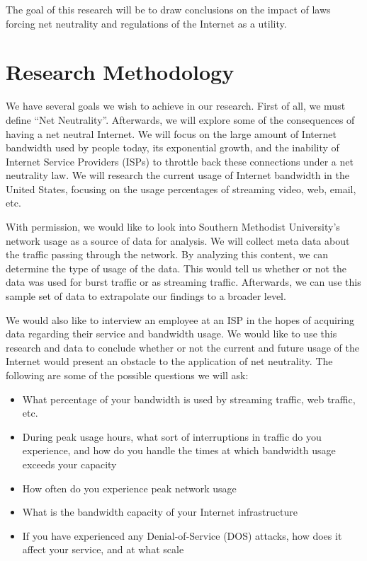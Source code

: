 \documentclass{sigcomm-alternate}
\begin{document}
The goal of this research will be to draw conclusions on the impact of laws forcing net neutrality and regulations of the Internet as a utility.

     		
\section{Research Methodology}
We have several goals we wish to achieve in our research. First of all, we must define ``Net Neutrality''. Afterwards, we will explore some of the consequences of having a net neutral Internet. We will focus on the large amount of Internet bandwidth used by people today, its exponential growth, and the inability of Internet Service Providers (ISPs) to throttle back these connections under a net neutrality law. We will research the current usage of Internet bandwidth in the United States, focusing on the usage percentages of streaming video, web, email, etc. 

With permission, we would like to look into Southern Methodist University's network usage as a source of data for analysis. We will collect meta data about the traffic passing through the network. By analyzing this content, we can determine the type of usage of the data. This would tell us whether or not the data was used for burst traffic or as streaming traffic. Afterwards, we can use this sample set of data to extrapolate our findings to a broader level. 

We would also like to interview an employee at an ISP in the hopes of acquiring data regarding their service and bandwidth usage. We would like to use this research and data to conclude whether or not the current and future usage of the Internet would present an obstacle to the application of net neutrality. The following are some of the possible questions we will ask:

\begin{itemize}
	\item What percentage of your bandwidth is used by streaming traffic, web traffic, etc.
	\item During peak usage hours, what sort of interruptions in traffic do you experience, and how do you handle the times at which bandwidth usage exceeds your capacity
	\item How often do you experience peak network usage
	\item What is the bandwidth capacity of your Internet infrastructure
	\item If you have experienced any Denial-of-Service (DOS) attacks, how does it affect your service, and at what scale
\end{itemize}
\end{document}
